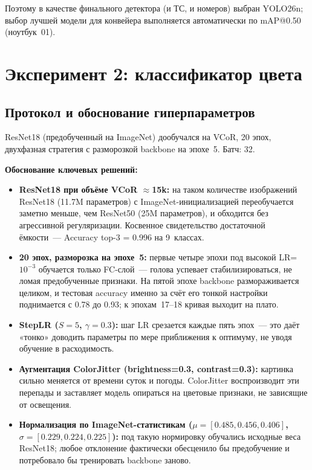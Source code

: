\documentclass[10pt,a4paper]{report}
\numberwithin{equation}{chapter}
\numberwithin{figure}{chapter}
\numberwithin{table}{chapter}
\begin{document}
Поэтому в качестве финального детектора (и ТС, и номеров) выбран YOLO26n;
выбор лучшей модели для конвейера выполняется автоматически по mAP@0.50
(ноутбук~01).

\section{Эксперимент 2: классификатор цвета}

\subsection{Протокол и обоснование гиперпараметров}

ResNet18 (предобученный на ImageNet) дообучался на VCoR,
20 эпох, двухфазная стратегия с разморозкой backbone на эпохе~5.
Батч: 32.

\textbf{Обоснование ключевых решений:}
\begin{itemize}
  \item \textbf{ResNet18 при объёме VCoR $\approx$15k:}
    на таком количестве изображений ResNet18 (11.7M параметров) с
    ImageNet-инициализацией переобучается заметно меньше, чем ResNet50
    (25M параметров), и обходится без агрессивной регуляризации.
    Косвенное свидетельство достаточной ёмкости~--- Accuracy top-3 =
    0.996 на 9~классах.

  \item \textbf{20 эпох, разморозка на эпохе~5:}
    первые четыре эпохи под высокой LR=$10^{-3}$ обучается только
    FC-слой~--- голова успевает стабилизироваться, не ломая
    предобученные признаки. На пятой эпохе backbone размораживается
    целиком, и тестовая accuracy именно за счёт его тонкой настройки
    поднимается с 0.78 до 0.93; к эпохам~17--18 кривая выходит на плато.

  \item \textbf{StepLR ($S=5$, $\gamma=0.3$):}
    шаг LR срезается каждые пять эпох~--- это даёт «тонко» доводить
    параметры по мере приближения к оптимуму, не уводя обучение в
    расходимость.

  \item \textbf{Аугментация ColorJitter (brightness=0.3,
    contrast=0.3):} картинка сильно меняется от времени
    суток и погоды. ColorJitter воспроизводит эти перепады и заставляет
    модель опираться на цветовые признаки, не зависящие от освещения.

  \item \textbf{Нормализация по ImageNet-статистикам
    ($\mu=[0.485, 0.456, 0.406]$, $\sigma=[0.229, 0.224, 0.225]$):}
    под такую нормировку обучались исходные веса ResNet18; любое
    отклонение фактически обесценило бы предобучение и потребовало бы
    тренировать backbone заново.
\end{itemize}
\end{document}
